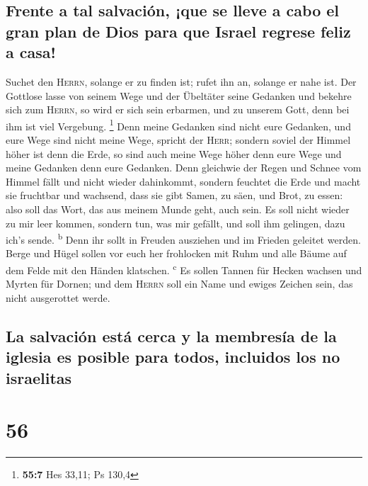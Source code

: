 \hypertarget{frente-a-tal-salvaciuxf3n-que-se-lleve-a-cabo-el-gran-plan-de-dios-para-que-israel-regrese-feliz-a-casa}{%
\subsection{Frente a tal salvación, ¡que se lleve a cabo el gran plan de
Dios para que Israel regrese feliz a
casa!}\label{frente-a-tal-salvaciuxf3n-que-se-lleve-a-cabo-el-gran-plan-de-dios-para-que-israel-regrese-feliz-a-casa}}

 Suchet den \textsc{Herrn}, solange er zu finden ist;
rufet ihn an, solange er nahe ist.  Der Gottlose lasse von
seinem Wege und der Übeltäter seine Gedanken und bekehre sich zum
\textsc{Herrn}, so wird er sich sein erbarmen, und zu unserem Gott, denn
bei ihm ist viel Vergebung. \footnote{\textbf{55:7} Hes 33,11; Ps 130,4}
 Denn meine Gedanken sind nicht eure Gedanken, und eure
Wege sind nicht meine Wege, spricht der \textsc{Herr}; 
sondern soviel der Himmel höher ist denn die Erde, so sind auch meine
Wege höher denn eure Wege und meine Gedanken denn eure Gedanken.
 Denn gleichwie der Regen und Schnee vom Himmel fällt und
nicht wieder dahinkommt, sondern feuchtet die Erde und macht sie
fruchtbar und wachsend, dass sie gibt Samen, zu säen, und Brot, zu
essen:  also soll das Wort, das aus meinem Munde geht,
auch sein. Es soll nicht wieder zu mir leer kommen, sondern tun, was mir
gefällt, und soll ihm gelingen, dazu ich's sende. \textsuperscript{b}
 Denn ihr sollt in Freuden ausziehen und im Frieden
geleitet werden. Berge und Hügel sollen vor euch her frohlocken mit Ruhm
und alle Bäume auf dem Felde mit den Händen klatschen.
\textsuperscript{c}  Es sollen Tannen für Hecken wachsen
und Myrten für Dornen; und dem \textsc{Herrn} soll ein Name und ewiges
Zeichen sein, das nicht ausgerottet werde.

\hypertarget{la-salvaciuxf3n-estuxe1-cerca-y-la-membresuxeda-de-la-iglesia-es-posible-para-todos-incluidos-los-no-israelitas}{%
\subsection{La salvación está cerca y la membresía de la iglesia es
posible para todos, incluidos los no
israelitas}\label{la-salvaciuxf3n-estuxe1-cerca-y-la-membresuxeda-de-la-iglesia-es-posible-para-todos-incluidos-los-no-israelitas}}

\hypertarget{section-55}{%
\section{56}\label{section-55}}

